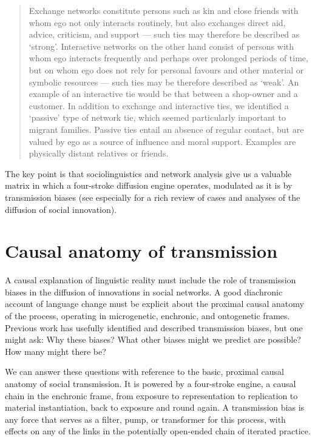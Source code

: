 \begin{quotation}
Exchange networks constitute persons such as kin and close friends with whom ego not only interacts routinely, but also exchanges direct aid, advice, criticism, and support --- such ties may therefore be described as \textquoteleft strong'.  Interactive networks on the other hand consist of persons with whom ego interacts frequently and perhaps over prolonged periods of time, but on whom ego does not rely for personal favours and other material or symbolic resources --- such ties may be therefore described as \textquoteleft weak'. An example of an interactive tie would be that between a shop-owner and a customer. In addition to exchange and interactive ties, we identified a \textquoteleft passive' type of network tie, which seemed particularly important to migrant families. Passive ties entail an absence of regular contact, but are valued by ego as a source of influence and moral support. Examples are physically distant relatives or friends. \citep[138--139]{milroy_social_1995}
\end{quotation}

The key point is that sociolinguistics and network analysis give us a valuable matrix in which a four-stroke diffusion engine operates, modulated as it is by transmission biases (see especially \citealt{rogers_diffusion_2003} for a rich review of cases and analyses of the diffusion of social innovation).

\section{Causal anatomy of transmission}



A causal explanation of linguistic reality must include the role of transmission biases in the diffusion of innovations in social networks. A good diachronic account of language change must be explicit about the proximal causal 
anatomy of the process, operating in microgenetic, enchronic, and ontogenetic frames. Previous work has usefully identified and 
described transmission biases, but one might ask: Why these biases? What 
other biases might we predict are possible? How many might there be? 



We can answer these questions with reference to the basic, proximal causal anatomy of social transmission. It is powered by a four-stroke engine, a causal chain in the enchronic frame, from 
exposure to representation to replication to material instantiation, 
back to exposure and round again. A transmission 
bias is any force that serves as a filter, pump, or transformer for this 
process, with effects on any of the links in the potentially open-ended chain of iterated practice. 


